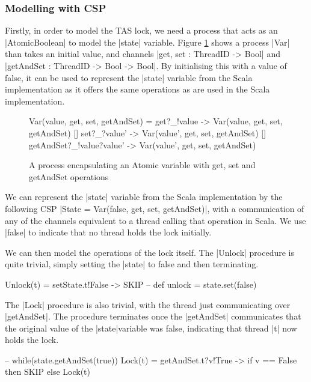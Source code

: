 \subsubsection{Modelling with CSP}

\inlineCSP

Firstly, in order to model the TAS lock, we need a process that acts as an |AtomicBoolean| to model the |state| variable. Figure \ref{csp:Variable} shows a process |Var| than takes an initial value, and channels |get, set : ThreadID -> Bool| and |getAndSet : ThreadID -> Bool -> Bool|. By initialising this with a value of false, it can be used to represent the |state| variable from the Scala implementation as it offers the same operations as are used in the Scala implementation.

\begin{figure}
  \begin{cspm}
  Var(value, get, set, getAndSet) = 
    get?_!value -> Var(value, get, set, getAndSet)
    [] set?_?value' -> Var(value', get, set, getAndSet)
    [] getAndSet?_!value?value' -> Var(value', get, set, getAndSet)
  \end{cspm}
  \caption{A process encapsulating an Atomic variable with get, set and getAndSet operations}
  \label{csp:Variable}
\end{figure}

We can represent the |state| variable from the Scala implementation by the following CSP |State = Var(false, get, set, getAndSet)|, with a communication of any of the channels equivalent to a thread calling that operation in Scala. We use |false| to indicate that no thread holds the lock initially.

We can then model the operations of the lock itself. The |Unlock| procedure is quite trivial, simply setting the |state| to false and then terminating.

\begin{cspm}
  Unlock(t) = setState.t!False -> SKIP -- def unlock = state.set(false)
\end{cspm}

The |Lock| procedure is also trivial, with the thread just communicating over |getAndSet|. The procedure terminates once the |getAndSet| communicates that the original value of the |state|variable was false, indicating that thread |t| now holds the lock.

\begin{cspm}
  -- while(state.getAndSet(true)){ }
  Lock(t) = getAndSet.t?v!True -> if v == False then SKIP 
                                    else Lock(t)
\end{cspm}


